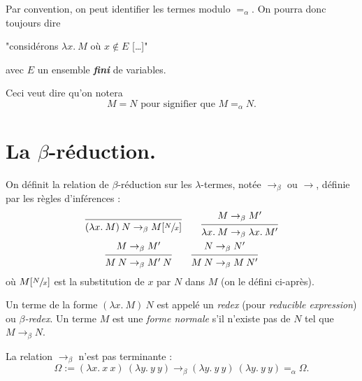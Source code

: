 \documentclass{../notes}
\begin{document}
  Par convention, on peut identifier les termes modulo $=_\alpha$.
  On pourra donc toujours dire 
  \begin{center}
    "considérons $\lambda x.\: M$ où $x \not\in  E$ [\ldots]"
  \end{center}
  avec $E$ un ensemble \textit{\textbf{fini}} de variables.

  Ceci veut dire qu'on notera \[
  M = N \text{ pour signifier que } M =_\alpha N
  .\] 

  \section{La $\beta$-réduction.}

  \begin{defn}
    On définit la relation de $\beta$-réduction sur les  $\lambda$-termes, notée $\to_\beta$ ou $\to$, définie par les règles d'inférences :
    \begin{gather*}
      \begin{prooftree}
        \infer 0{(\lambda x.\: M)\: N \to_\beta M[\sfrac{N}{x}]}
      \end{prooftree}
      \quad\quad
      \begin{prooftree}
        \hypo{M \to_\beta M'}
        \infer 1{\lambda x.\: M \to_\beta \lambda x.\: M'}
      \end{prooftree}\\
      \begin{prooftree}
        \hypo{M \to_\beta M'}
        \infer 1{M \: N \to_\beta M' \: N}
      \end{prooftree}
      \quad\quad
      \begin{prooftree}
        \hypo{N \to_\beta N'}
        \infer 1{M \: N \to_\beta M \: N'}
      \end{prooftree}
    \end{gather*}
    où $M[\sfrac{N}{x}]$ est la substitution de $x$ par $N$ dans $M$ (on le défini ci-après).
  \end{defn}

  \begin{defn}
    Un terme de la forme $(\lambda x. \: M)\: N$ est appelé un  \textit{redex} (pour \textit{reducible expression}) ou  \textit{$\beta$-redex}.
    Un terme $M$ est une \textit{forme normale}  s'il n'existe pas de $N$ tel que $M \to_\beta N$.
  \end{defn}

  \begin{rmk}
    La relation $\to_\beta$ n'est pas terminante :
    \[
      \Omega := (\lambda x.\: x \: x) \: (\lambda y.\: y \: y) \to_\beta (\lambda y.\: y \: y) \: (\lambda y.\: y \: y) =_\alpha \Omega
    .\] 
  \end{rmk}
\end{document}
